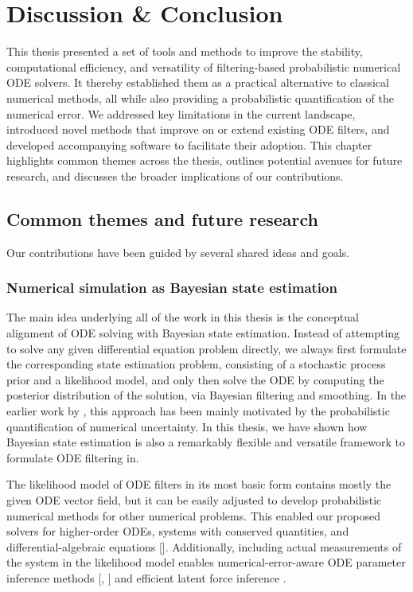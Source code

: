 \documentclass{mimosis}
\begin{document}
\chapter{Discussion \& Conclusion}
\label{sec:org8132aa7}
\label{sec:conclusion}
This thesis presented a set of tools and methods to improve the stability, computational efficiency, and versatility of filtering-based probabilistic numerical ODE solvers.
It thereby established them as a practical alternative to classical numerical methods, all while also providing a probabilistic quantification of the numerical error.
We addressed key limitations in the current landscape, introduced novel methods that improve on or extend existing ODE filters, and developed accompanying software to facilitate their adoption.
This chapter highlights common themes across the thesis,
outlines potential avenues for future research,
and
discusses the broader implications of our contributions.
\section{Common themes and future research}
\label{sec:org86ac229}
Our contributions have been guided by several shared ideas and goals.
\subsection{Numerical simulation as Bayesian state estimation}
\label{sec:org2c68e4a}
The main idea underlying all of the work in this thesis is the conceptual alignment of ODE solving with Bayesian state estimation.
Instead of attempting to solve any given differential equation problem directly, we always first formulate the corresponding state estimation problem, consisting of a stochastic process prior and a likelihood model, and only then solve the ODE by computing the posterior distribution of the solution, via Bayesian filtering and smoothing.
In the earlier work by
\textcite{schober16_probab_model_numer_solut_initial_value_probl,kersting18_conver_rates_gauss_ode_filter,tronarp18_probab_solut_to_ordin_differ},
this approach has been mainly motivated by the probabilistic quantification of numerical uncertainty.
In this thesis, we have shown how
Bayesian state estimation is also a remarkably flexible and versatile framework to formulate ODE filtering in.

The likelihood model of ODE filters in its most basic form contains mostly the given ODE vector field, but it can be easily adjusted to develop probabilistic numerical methods for other numerical problems.
This enabled our proposed solvers for higher-order ODEs, systems with conserved quantities, and differential-algebraic equations
{[}\spickandmix{}].
Additionally, including actual measurements of the system in the likelihood model enables numerical-error-aware ODE parameter inference methods
{[}\sfenrir{}, \stempering{}]
and efficient latent force inference
\parencite{schmidt21_probab_state_space_model_joint}.
\end{document}
